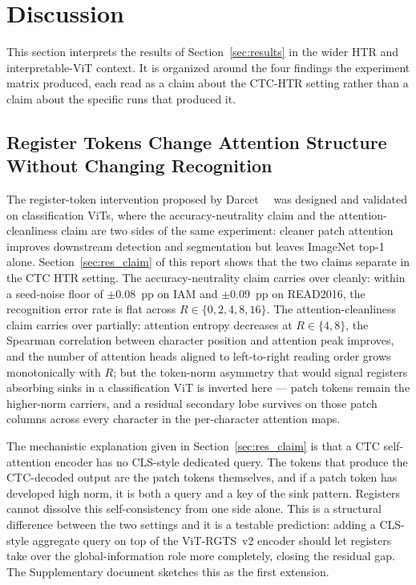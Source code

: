 \section{Discussion}
\label{sec:discussion}

This section interprets the results of Section~\ref{sec:results} in the wider HTR and interpretable-ViT context. It is organized around the four findings the experiment matrix produced, each read as a claim about the CTC-HTR setting rather than a claim about the specific runs that produced it.

\subsection{Register Tokens Change Attention Structure Without Changing Recognition}
\label{sec:disc_registers}

The register-token intervention proposed by Darcet~\etal~\cite{darcet2024registers} was designed and validated on classification ViTs, where the accuracy-neutrality claim and the attention-cleanliness claim are two sides of the same experiment: cleaner patch attention improves downstream detection and segmentation but leaves ImageNet top-1 alone. Section~\ref{sec:res_claim} of this report shows that the two claims separate in the CTC HTR setting. The accuracy-neutrality claim carries over cleanly: within a seed-noise floor of $\pm 0.08$~pp on IAM and $\pm 0.09$~pp on READ2016, the recognition error rate is flat across $R \in \{0, 2, 4, 8, 16\}$. The attention-cleanliness claim carries over partially: attention entropy decreases at $R \in \{4, 8\}$, the Spearman correlation between character position and attention peak improves, and the number of attention heads aligned to left-to-right reading order grows monotonically with $R$; but the token-norm asymmetry that would signal registers absorbing sinks in a classification ViT is inverted here --- patch tokens remain the higher-norm carriers, and a residual secondary lobe survives on those patch columns across every character in the per-character attention maps.

The mechanistic explanation given in Section~\ref{sec:res_claim} is that a CTC self-attention encoder has no CLS-style dedicated query. The tokens that produce the CTC-decoded output are the patch tokens themselves, and if a patch token has developed high norm, it is both a query and a key of the sink pattern. Registers cannot dissolve this self-consistency from one side alone. This is a structural difference between the two settings and it is a testable prediction: adding a CLS-style aggregate query on top of the ViT-RGTS~v2 encoder should let registers take over the global-information role more completely, closing the residual gap. The Supplementary document sketches this as the first extension.

